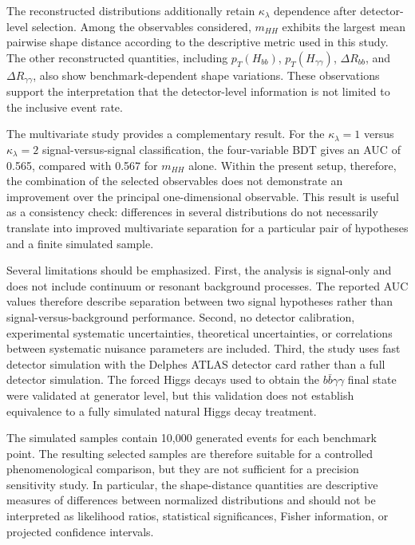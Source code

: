 \documentclass[11pt,a4paper]{article}
\begin{document}
The reconstructed distributions additionally retain $\kappa_\lambda$ dependence after detector-level selection. Among the observables considered, $m_{HH}$ exhibits the largest mean pairwise shape distance according to the descriptive metric used in this study. The other reconstructed quantities, including $p_T(H_{bb})$, $p_T(H_{\gamma\gamma})$, $\Delta R_{bb}$, and $\Delta R_{\gamma\gamma}$, also show benchmark-dependent shape variations. These observations support the interpretation that the detector-level information is not limited to the inclusive event rate.

The multivariate study provides a complementary result. For the $\kappa_\lambda=1$ versus $\kappa_\lambda=2$ signal-versus-signal classification, the four-variable BDT gives an AUC of 0.565, compared with 0.567 for $m_{HH}$ alone. Within the present setup, therefore, the combination of the selected observables does not demonstrate an improvement over the principal one-dimensional observable. This result is useful as a consistency check: differences in several distributions do not necessarily translate into improved multivariate separation for a particular pair of hypotheses and a finite simulated sample.

Several limitations should be emphasized. First, the analysis is signal-only and does not include continuum or resonant background processes. The reported AUC values therefore describe separation between two signal hypotheses rather than signal-versus-background performance. Second, no detector calibration, experimental systematic uncertainties, theoretical uncertainties, or correlations between systematic nuisance parameters are included. Third, the study uses fast detector simulation with the Delphes ATLAS detector card rather than a full detector simulation. The forced Higgs decays used to obtain the $b\bar b\gamma\gamma$ final state were validated at generator level, but this validation does not establish equivalence to a fully simulated natural Higgs decay treatment.

The simulated samples contain 10,000 generated events for each benchmark point. The resulting selected samples are therefore suitable for a controlled phenomenological comparison, but they are not sufficient for a precision sensitivity study. In particular, the shape-distance quantities are descriptive measures of differences between normalized distributions and should not be interpreted as likelihood ratios, statistical significances, Fisher information, or projected confidence intervals.
\end{document}
